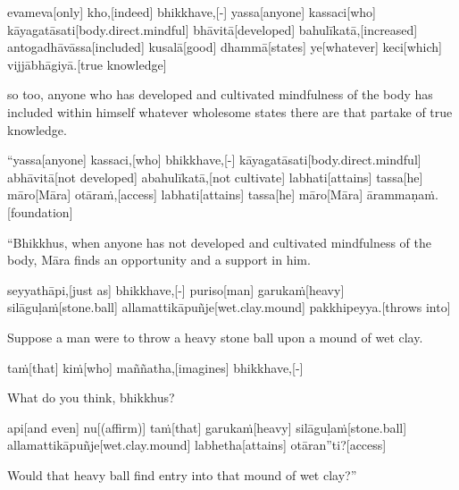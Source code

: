 \begin{samepage}
\begingl[glneveryline={\PaliGlossA,\PaliGlossB}]
evameva[only] kho,[indeed] bhikkhave,[-] yassa[anyone] kassaci[who] kāyagatāsati[body.direct.mindful] bhāvitā[developed] bahulīkatā,[increased] antogadhāvāssa[included] kusalā[good] dhammā[states] ye[whatever] keci[which] vijjābhāgiyā.[true knowledge]
\endgl
\nopagebreak
\linespread{0.5}
\begin{spacin}{0.2}
{\PaliGlossFT so too, anyone who has developed and cultivated mindfulness of the body has included within himself whatever wholesome states there are that partake of true knowledge.}
\end{spacin}
\vskip 12pt
\end{samepage}
\begin{samepage}
\begingl[glneveryline={\PaliGlossA,\PaliGlossB}]
“yassa[anyone] kassaci,[who] bhikkhave,[-] kāyagatāsati[body.direct.mindful] abhāvitā[not developed] abahulīkatā,[not cultivate] labhati[attains] tassa[he] māro[Māra] otāraṁ,[access] labhati[attains] tassa[he] māro[Māra] ārammaṇaṁ.[foundation]
\endgl
\nopagebreak
\linespread{0.5}
\begin{spacin}{0.2}
{\PaliGlossFT “Bhikkhus, when anyone has not developed and cultivated mindfulness of the body, Māra finds an opportunity and a support in him.}
\end{spacin}
\vskip 12pt
\end{samepage}
\begin{samepage}
\begingl[glneveryline={\PaliGlossA,\PaliGlossB}]
seyyathāpi,[just as] bhikkhave,[-] puriso[man] garukaṁ[heavy] silāguḷaṁ[stone.ball] allamattikāpuñje[wet.clay.mound] pakkhipeyya.[throws into]
\endgl
\nopagebreak
\linespread{0.5}
\begin{spacin}{0.2}
{\PaliGlossFT Suppose a man were to throw a heavy stone ball upon a mound of wet clay.}
\end{spacin}
\vskip 12pt
\end{samepage}
\begin{samepage}
\begingl[glneveryline={\PaliGlossA,\PaliGlossB}]
taṁ[that] kiṁ[who] maññatha,[imagines] bhikkhave,[-]
\endgl
\nopagebreak
\linespread{0.5}
\begin{spacin}{0.2}
{\PaliGlossFT What do you think, bhikkhus?}
\end{spacin}
\vskip 12pt
\end{samepage}
\begin{samepage}
\begingl[glneveryline={\PaliGlossA,\PaliGlossB}]
api[and even] nu[(affirm)] taṁ[that] garukaṁ[heavy] silāguḷaṁ[stone.ball] allamattikāpuñje[wet.clay.mound] labhetha[attains] otāran”ti?[access]
\endgl
\nopagebreak
\linespread{0.5}
\begin{spacin}{0.2}
{\PaliGlossFT Would that heavy ball find entry into that mound of wet clay?”}
\end{spacin}
\vskip 12pt
\end{samepage}
